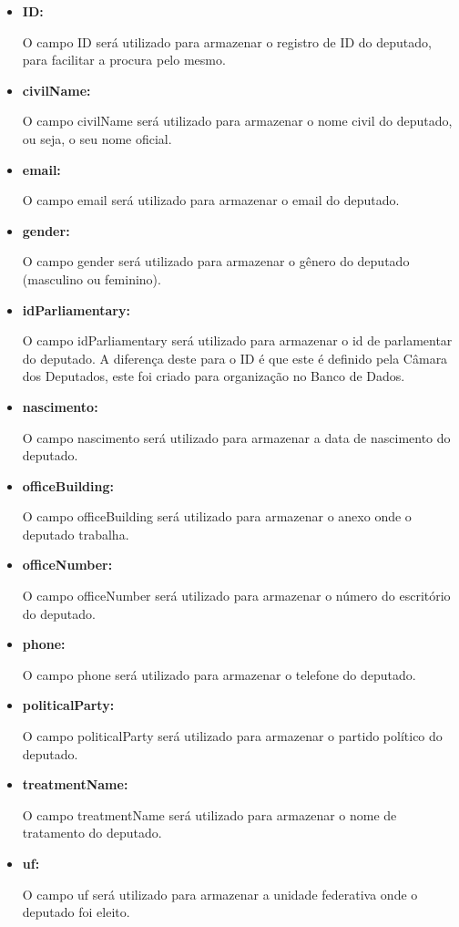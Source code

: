 	\begin{itemize}
		\item \textbf{ID:}

			O campo ID será utilizado para armazenar o registro de ID do deputado, para facilitar a procura pelo mesmo.

		\item \textbf{civilName:}

			O campo civilName será utilizado para armazenar o nome civil do deputado, ou seja, o seu nome oficial.

		\item \textbf{email:}

			O campo email será utilizado para armazenar o email do deputado.

		\item \textbf{gender:}

			O campo gender será utilizado para armazenar o gênero do deputado (masculino ou feminino).

		\item \textbf{idParliamentary:}

			O campo idParliamentary será utilizado para armazenar o id de parlamentar do deputado. A diferença deste para o ID é que este é definido pela Câmara dos Deputados, este foi criado para organização no Banco de Dados.

		\item \textbf{nascimento:}

			O campo nascimento será utilizado para armazenar a data de nascimento do deputado.

		\item \textbf{officeBuilding:}

			O campo officeBuilding será utilizado para armazenar o anexo onde o deputado trabalha.

		\item \textbf{officeNumber:}

			O campo officeNumber será utilizado para armazenar o número do escritório do deputado.

		\item \textbf{phone:}

			O campo phone será utilizado para armazenar o telefone do deputado.

		\item \textbf{politicalParty:}

			O campo politicalParty será utilizado para armazenar o partido político do deputado.

		\item \textbf{treatmentName:}

			O campo treatmentName será utilizado para armazenar o nome de tratamento do deputado.

		\item \textbf{uf:}

			O campo uf será utilizado para armazenar a unidade federativa onde o deputado foi eleito.

	\end{itemize}


